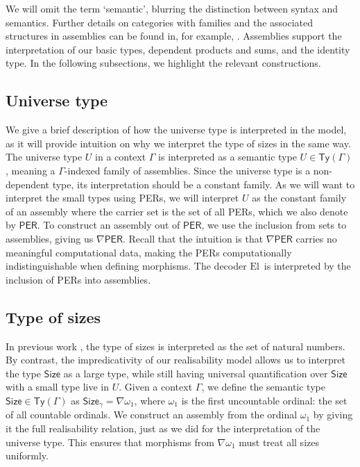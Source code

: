 \documentclass[10pt,a4paper]{article}
\theoremstyle{definition}
\theoremstyle{remark}
\renewcommand{\.}{.\,} %
\renewcommand{\:}{:} %
\newcommand{\El}{\mathrm{El}\,}
\newcommand{\Size}{\mathsf{Size}}
\newcommand{\0}{\mathbf{0}}
\newcommand{\1}{\mathbf{1}}
\newcommand\<\langle
\renewcommand\>\rangle
\newcommand{\Per}{\mathsf{PER}}
\newcommand{\Ty}{\mathsf{Ty}}
\newcommand{\Tm}{\mathsf{Tm}}
\newcommand{\U}{U}
\theoremstyle{remark}
\begin{document}
We will omit the term `semantic', blurring the distinction between syntax and semantics. Further details on categories with families and the associated structures in assemblies can be found in, for example, \cite{Hofmann_1997, REUS1999128}. Assemblies support the interpretation of our basic types, dependent products and sums, and the identity type. In the following subsections, we highlight the relevant constructions.


\subsection{Universe type}
We give a brief description of how the universe type is interpreted in the model, as it will provide intuition on why we interpret the type of sizes in the same way.
The universe type \( U \) in a context \( \Gamma \) is interpreted as a semantic type \( U \in \Ty(\Gamma) \), meaning a \( \Gamma \)-indexed family of assemblies. Since the universe type is a non-dependent type, its interpretation should be a constant family. As we will want to interpret the small types using PERs, we will interpret \( U \) as the constant family of an assembly where the carrier set is the set of all PERs, which we also denote by \( \Per \). To construct an assembly out of \( \Per \), we use the inclusion from sets to assemblies, giving us \( \nabla \Per \). Recall that the intuition is that \( \nabla \Per \) carries no meaningful computational data, making the PERs computationally indistinguishable when defining morphisms.
The decoder \( \El \) is interpreted by the inclusion of PERs into assemblies.

\subsection{Type of sizes}
In previous work \cite{parametric-quantifier}, the type of sizes is interpreted as the set of natural numbers. By contrast, the impredicativity of our realisability model allows us to interpret the type $\Size$ as a large type, while still having universal quantification over $\Size$ with a small type live in $\U$. Given a context $\Gamma$, we define the semantic type $\Size \in \Ty(\Gamma)$ as $\Size_\gamma = \nabla \omega_1$, where $\omega_1$ is the first uncountable ordinal: the set of all countable ordinals.
We construct an assembly from the ordinal \( \omega_1 \) by giving it the full realisability relation, just as we did for the interpretation of the universe type. This ensures that morphisms from \( \nabla \omega_1 \) must treat all sizes uniformly.
\end{document}
